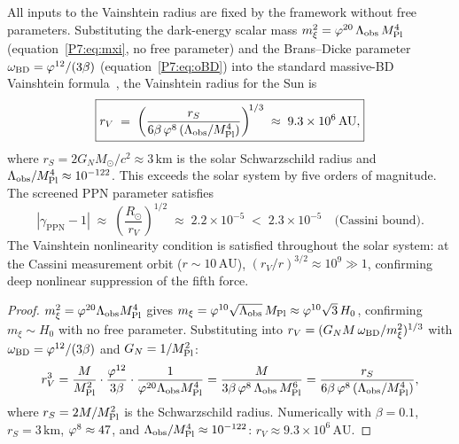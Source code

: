 \begin{theorem}
\label{P7:thm:cassini}
All inputs to the Vainshtein radius are fixed by the framework without
free parameters.  Substituting the dark-energy scalar mass
$m_\xi^2 = \varphi^{20}\,\Lambda_{\mathrm{obs}}\,M_{\mathrm{Pl}}^4$
(equation~\eqref{P7:eq:mxi}, no free parameter) and the Brans--Dicke parameter
$\omega_{\mathrm{BD}} = \varphi^{12}/(3\beta)$ (equation~\eqref{P7:eq:oBD}) into the standard
massive-BD Vainshtein formula~\cite{Vainshtein1972,Dvali2000},
the Vainshtein radius for the Sun is
\begin{equation}
  \boxed{r_V
  \;=\; \left(\frac{r_S}{6\beta\,\varphi^8\,
        (\Lambda_{\mathrm{obs}}/M_{\mathrm{Pl}}^4)}\right)^{\!1/3}
  \;\approx\; 9.3\times10^6\,\mathrm{AU},}
  \label{P7:eq:rV_exact}
\end{equation}
where $r_S = 2G_N M_\odot/c^2\approx3\,\mathrm{km}$ is the solar
Schwarzschild radius and $\Lambda_{\mathrm{obs}}/M_{\mathrm{Pl}}^4\approx10^{-122}$.
This exceeds the solar system by five orders of magnitude.
The screened PPN parameter satisfies
\begin{equation}
  |\gamma_{\mathrm{PPN}}-1|
  \;\approx\;\left(\frac{R_\odot}{r_V}\right)^{1/2}
  \;\approx\; 2.2\times10^{-5}
  \;<\; 2.3\times10^{-5} \quad\text{(Cassini bound).}
  \label{P7:eq:gamma_PPN}
\end{equation}
The Vainshtein nonlinearity condition is satisfied throughout the solar
system: at the Cassini measurement orbit ($r\sim10\,\mathrm{AU}$),
$(r_V/r)^{3/2}\approx10^{9}\gg1$, confirming deep nonlinear
suppression of the fifth force.
\end{theorem}

\begin{proof}
$m_\xi^2=\varphi^{20}\Lambda_{\mathrm{obs}}M_{\mathrm{Pl}}^4$ gives
$m_\xi=\varphi^{10}\sqrt{\Lambda_{\mathrm{obs}}}\,M_{\mathrm{Pl}}\approx\varphi^{10}\sqrt3\,H_0$,
confirming $m_\xi\sim H_0$ with no free parameter. Substituting into
$r_V=(G_NM\,\omega_{\mathrm{BD}}/m_\xi^2)^{1/3}$ with $\omega_{\mathrm{BD}}=\varphi^{12}/(3\beta)$ and
$G_N=1/M_{\mathrm{Pl}}^2$:
\begin{equation}
  r_V^3
  = \frac{M}{M_{\mathrm{Pl}}^2}\cdot\frac{\varphi^{12}}{3\beta}
    \cdot\frac{1}{\varphi^{20}\Lambda_{\mathrm{obs}}M_{\mathrm{Pl}}^4}
  = \frac{M}{3\beta\,\varphi^8\,\Lambda_{\mathrm{obs}}\,M_{\mathrm{Pl}}^6}
  = \frac{r_S}{6\beta\,\varphi^8\,(\Lambda_{\mathrm{obs}}/M_{\mathrm{Pl}}^4)},
  \label{P7:eq:rV_derivation}
\end{equation}
where $r_S=2M/M_{\mathrm{Pl}}^2$ is the Schwarzschild radius. Numerically with
$\beta=0.1$, $r_S=3\,\mathrm{km}$, $\varphi^8\approx47$, and
$\Lambda_{\mathrm{obs}}/M_{\mathrm{Pl}}^4\approx10^{-122}$:
$r_V\approx9.3\times10^6\,\mathrm{AU}$.
\end{proof}

